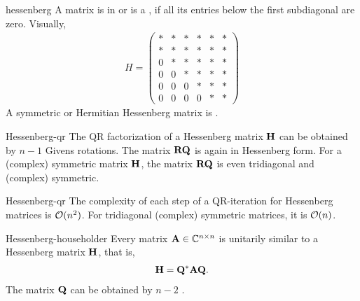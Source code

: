 \begin{Definition}{hessenberg}
  A matrix is in  or is a , if all its entries below the first subdiagonal are zero. Visually,
  \begin{gather}
    H = 
    \begin{pmatrix}
      *&*&*&*&*&*\\
      *&*&*&*&*&*\\
      0&*&*&*&*&*\\
      0&0&*&*&*&*\\
      0&0&0&*&*&*\\
      0&0&0&0&*&*
    \end{pmatrix}
  \end{gather}
  A symmetric or Hermitian Hessenberg matrix is .
\end{Definition}

\begin{Theorem}{Hessenberg-qr}
  The QR factorization of a Hessenberg matrix $\mathbf H$ can be obtained
  by $n-1$ Givens rotations. The matrix $\mathbf R\mathbf Q$ is again in
  Hessenberg form. For a (complex) symmetric matrix $\mathbf H$, the
  matrix $\mathbf R\mathbf Q$ is even tridiagonal and (complex) symmetric.
\end{Theorem}

\begin{Corollary}{Hessenberg-qr}
  The complexity of each step of a QR-iteration for Hessenberg matrices is $\mathcal O(n^2)$. For tridiagonal (complex) symmetric matrices, it is $\mathcal O(n)$.
\end{Corollary}

\begin{Theorem}{Hessenberg-householder}
  Every matrix $\mathbf A\in\mathbb C^{n\times n}$ is unitarily similar to a Hessenberg matrix $\mathbf H$, that is,
  \begin{gather}
    \mathbf H = \mathbf Q^* \mathbf A \mathbf Q.
  \end{gather}
  The matrix $\mathbf Q$ can be obtained by $n-2$ .
\end{Theorem}

